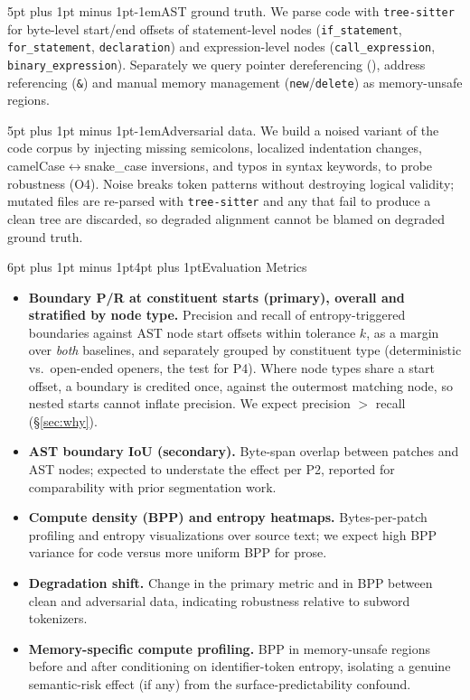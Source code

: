 \documentclass[9pt]{extarticle}
\makeatletter
\renewcommand\section{\@startsection{section}{1}{0pt}%
  {6pt plus 1pt minus 1pt}{4pt plus 1pt}{\normalfont\large\bfseries}}
\renewcommand\paragraph{\@startsection{paragraph}{4}{0pt}%
  {5pt plus 1pt minus 1pt}{-1em}{\normalfont\normalsize\bfseries}}
\newcommand{\code}[1]{\texttt{\small #1}}
\makeatother
\begin{document}
\paragraph{AST ground truth.} We parse code with \code{tree-sitter} for byte-level
start/end offsets of statement-level nodes (\code{if\_statement},
\code{for\_statement}, \code{declaration}) and expression-level nodes
(\code{call\_expression}, \code{binary\_expression}). Separately we query pointer
dereferencing (\code{*}), address referencing (\code{\&}) and manual memory
management (\code{new}/\code{delete}) as memory-unsafe regions.

\paragraph{Adversarial data.} We build a noised variant of the code corpus by
injecting missing semicolons, localized indentation changes,
camelCase$\leftrightarrow$snake\_case inversions, and typos in syntax keywords, to
probe robustness (O4). Noise breaks token patterns without destroying logical
validity; mutated files are re-parsed with \code{tree-sitter} and any that fail
to produce a clean tree are discarded, so degraded alignment cannot be blamed
on degraded ground truth.

\section{Evaluation Metrics}
\label{sec:metrics}

\begin{itemize}
\item \textbf{Boundary P/R at constituent starts (primary), overall and
stratified by node type.} Precision and recall of entropy-triggered boundaries
against AST node start offsets within tolerance $k$, as a margin over
\emph{both} baselines, and separately grouped by constituent type
(deterministic vs.\ open-ended openers, the test for P4). Where node types
share a start offset, a boundary is credited once, against the outermost
matching node, so nested starts cannot inflate precision. We expect
precision $>$ recall (\S\ref{sec:why}).
\item \textbf{AST boundary IoU (secondary).} Byte-span overlap between patches and
AST nodes; expected to understate the effect per P2, reported for comparability
with prior segmentation work.
\item \textbf{Compute density (BPP) and entropy heatmaps.} Bytes-per-patch
profiling and entropy visualizations over source text; we expect high BPP variance
for code versus more uniform BPP for prose.
\item \textbf{Degradation shift.} Change in the primary metric and in BPP between
clean and adversarial data, indicating robustness relative to subword tokenizers.
\item \textbf{Memory-specific compute profiling.} BPP in memory-unsafe regions
before and after conditioning on identifier-token entropy, isolating a genuine
semantic-risk effect (if any) from the surface-predictability confound.
\end{itemize}
\end{document}
